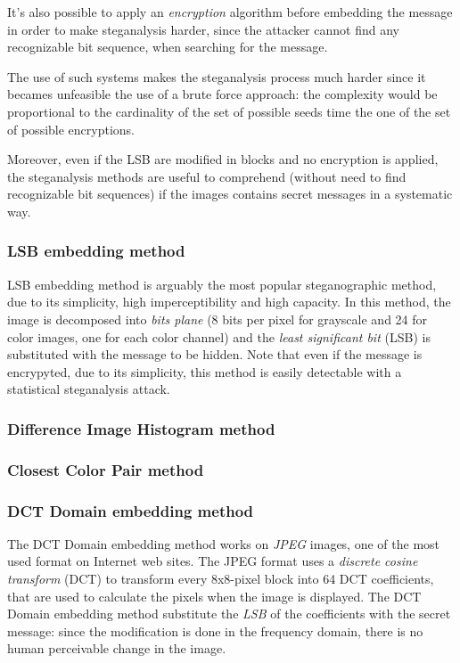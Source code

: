 \documentclass[../../main.tex]{subfiles}
\begin{document}
    It's also possible to apply an \emph{encryption} algorithm before embedding
    the message in order to make steganalysis harder, since the attacker cannot
    find any recognizable bit sequence, when searching for the message.

    The use of such systems makes the steganalysis process much harder since it
    becames unfeasible the use of a brute force approach: the complexity would
    be proportional to the cardinality of the set of possible seeds time the
    one of the set of possible encryptions.

    Moreover, even if the LSB are modified in blocks and no encryption is
    applied, the steganalysis methods are useful to comprehend (without need to
    find recognizable bit sequences) if the images contains secret messages in
    a systematic way.


    \subsubsection{LSB embedding method}
    LSB embedding method is arguably the most popular steganographic method, due
    to its simplicity, high imperceptibility and high capacity.
    In this method, the image is decomposed into \emph{bits plane} (8 bits per
    pixel for grayscale and 24 for color images, one for each color channel)
    and the \emph{least significant bit} (LSB) is substituted with the message
    to be hidden.
    Note that even if the message is encrypyted, due to its simplicity, this
    method is easily detectable with a statistical steganalysis attack.
    

    \subsubsection{Difference Image Histogram method}


    \subsubsection{Closest Color Pair method}


    \subsubsection{DCT Domain embedding method}
    The DCT Domain embedding method works on \emph{JPEG} images, one of the most
    used format on Internet web sites.
    The JPEG format uses a \emph{discrete cosine transform} (DCT) to transform
    every 8x8-pixel block into 64 DCT coefficients, that are used to calculate
    the pixels when the image is displayed.
    The DCT Domain embedding method substitute the \emph{LSB} of the
    coefficients with the secret message: since the modification is done in the
    frequency domain, there is no human perceivable change in the image.
\end{document}
